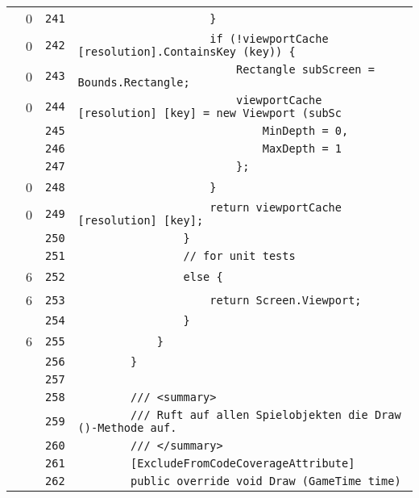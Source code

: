 \documentclass[a4paper,10pt]{article}
\begin{document}
\begin{longtable}[l]{lrrl}
\cellcolor{red} & 0 & \verb~241~ & \verb~                    }~\\
\cellcolor{red} & 0 & \verb~242~ & \verb~                    if (!viewportCache [resolution].ContainsKey (key)) {~\\
\cellcolor{red} & 0 & \verb~243~ & \verb~                        Rectangle subScreen = Bounds.Rectangle;~\\
\cellcolor{red} & 0 & \verb~244~ & \verb~                        viewportCache [resolution] [key] = new Viewport (subSc~\\
\cellcolor{gray} &  & \verb~245~ & \verb~                            MinDepth = 0,~\\
\cellcolor{gray} &  & \verb~246~ & \verb~                            MaxDepth = 1~\\
\cellcolor{gray} &  & \verb~247~ & \verb~                        };~\\
\cellcolor{red} & 0 & \verb~248~ & \verb~                    }~\\
\cellcolor{red} & 0 & \verb~249~ & \verb~                    return viewportCache [resolution] [key];~\\
\cellcolor{gray} &  & \verb~250~ & \verb~                }~\\
\cellcolor{gray} &  & \verb~251~ & \verb~                // for unit tests~\\
\cellcolor{green} & 6 & \verb~252~ & \verb~                else {~\\
\cellcolor{green} & 6 & \verb~253~ & \verb~                    return Screen.Viewport;~\\
\cellcolor{gray} &  & \verb~254~ & \verb~                }~\\
\cellcolor{green} & 6 & \verb~255~ & \verb~            }~\\
\cellcolor{gray} &  & \verb~256~ & \verb~        }~\\
\cellcolor{gray} &  & \verb~257~ & \verb~~\\
\cellcolor{gray} &  & \verb~258~ & \verb~        /// <summary>~\\
\cellcolor{gray} &  & \verb~259~ & \verb~        /// Ruft auf allen Spielobjekten die Draw ()-Methode auf.~\\
\cellcolor{gray} &  & \verb~260~ & \verb~        /// </summary>~\\
\cellcolor{gray} &  & \verb~261~ & \verb~        [ExcludeFromCodeCoverageAttribute]~\\
\cellcolor{gray} &  & \verb~262~ & \verb~        public override void Draw (GameTime time)~\\

\end{longtable}
\end{document}
